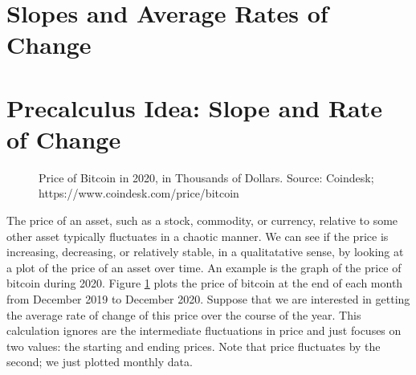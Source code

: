 \section{Slopes and Average Rates of Change}
\label{sec:slope}

\section*{Precalculus Idea: Slope and Rate of Change}


\begin{figure}
  \vspace{-20pt}
\centering
{}
\caption{Price of Bitcoin in 2020, in Thousands of Dollars. Source: Coindesk; https://www.coindesk.com/price/bitcoin}
\label{fig:2-1-bitcoin2020}
\end{figure}
The price of an asset, such as a stock, commodity, or currency, relative to some other asset typically fluctuates in a chaotic manner. We can see if the price is increasing, decreasing, or relatively stable, in a qualitatative sense, by looking at a plot of the price of an asset over time. An example is the graph of the price of bitcoin during 2020. Figure \ref{fig:2-1-bitcoin2020} plots the price of bitcoin at the end of each month from December 2019 to December 2020. Suppose that we are interested in getting the average rate of change of this price over the course of the year. This calculation ignores are the intermediate fluctuations in price and just focuses on two values: the starting and ending prices. Note that price fluctuates by the second; we just plotted monthly data.

